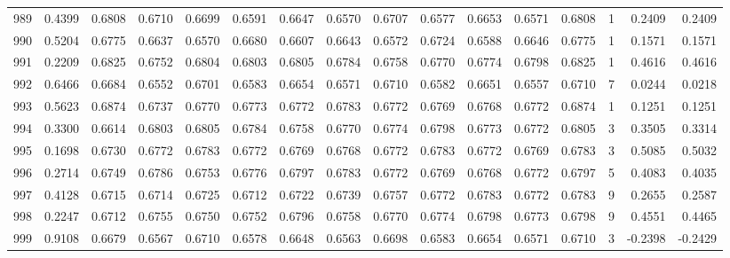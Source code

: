 \begin{tabular}{lrrrrrrrrrrrrrrr}
989 &      0.4399 &  0.6808 &  0.6710 &  0.6699 &  0.6591 &  0.6647 &  0.6570 &  0.6707 &  0.6577 &  0.6653 &   0.6571 &     0.6808 &      1 &                    0.2409 &                     0.2409 \\
990 &      0.5204 &  0.6775 &  0.6637 &  0.6570 &  0.6680 &  0.6607 &  0.6643 &  0.6572 &  0.6724 &  0.6588 &   0.6646 &     0.6775 &      1 &                    0.1571 &                     0.1571 \\
991 &      0.2209 &  0.6825 &  0.6752 &  0.6804 &  0.6803 &  0.6805 &  0.6784 &  0.6758 &  0.6770 &  0.6774 &   0.6798 &     0.6825 &      1 &                    0.4616 &                     0.4616 \\
992 &      0.6466 &  0.6684 &  0.6552 &  0.6701 &  0.6583 &  0.6654 &  0.6571 &  0.6710 &  0.6582 &  0.6651 &   0.6557 &     0.6710 &      7 &                    0.0244 &                     0.0218 \\
993 &      0.5623 &  0.6874 &  0.6737 &  0.6770 &  0.6773 &  0.6772 &  0.6783 &  0.6772 &  0.6769 &  0.6768 &   0.6772 &     0.6874 &      1 &                    0.1251 &                     0.1251 \\
994 &      0.3300 &  0.6614 &  0.6803 &  0.6805 &  0.6784 &  0.6758 &  0.6770 &  0.6774 &  0.6798 &  0.6773 &   0.6772 &     0.6805 &      3 &                    0.3505 &                     0.3314 \\
995 &      0.1698 &  0.6730 &  0.6772 &  0.6783 &  0.6772 &  0.6769 &  0.6768 &  0.6772 &  0.6783 &  0.6772 &   0.6769 &     0.6783 &      3 &                    0.5085 &                     0.5032 \\
996 &      0.2714 &  0.6749 &  0.6786 &  0.6753 &  0.6776 &  0.6797 &  0.6783 &  0.6772 &  0.6769 &  0.6768 &   0.6772 &     0.6797 &      5 &                    0.4083 &                     0.4035 \\
997 &      0.4128 &  0.6715 &  0.6714 &  0.6725 &  0.6712 &  0.6722 &  0.6739 &  0.6757 &  0.6772 &  0.6783 &   0.6772 &     0.6783 &      9 &                    0.2655 &                     0.2587 \\
998 &      0.2247 &  0.6712 &  0.6755 &  0.6750 &  0.6752 &  0.6796 &  0.6758 &  0.6770 &  0.6774 &  0.6798 &   0.6773 &     0.6798 &      9 &                    0.4551 &                     0.4465 \\
999 &      0.9108 &  0.6679 &  0.6567 &  0.6710 &  0.6578 &  0.6648 &  0.6563 &  0.6698 &  0.6583 &  0.6654 &   0.6571 &     0.6710 &      3 &                   -0.2398 &                    -0.2429 \\
\bottomrule
\end{tabular}
